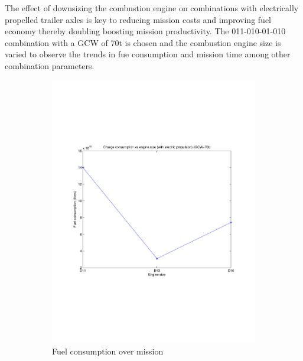 \documentclass{article}
\begin{document}
The effect of downsizing the combustion engine on combinations with electrically propelled trailer axles is key to reducing mission costs and improving fuel economy thereby doubling boosting mission productivity. The 011-010-01-010 combination with a GCW of 70t is chosen and the combustion engine size is varied to observe the trends in fue consumption and mission time among other combination parameters.\\

\begin{figure}[h!]
\begin{subfigure}{.5\textwidth}
	\centering
	\includegraphics[width=\linewidth, clip=true, trim=45 185 65 206]{Figures/Engine_downsizing/Fuel_consumption_vs_engine_size_(with_electric_propulsion).pdf}
	\caption{Fuel consumption over mission}
\end{subfigure}
\begin{subfigure}{.5\textwidth}
	\centering

\end{subfigure}
\end{figure}
\end{document}
